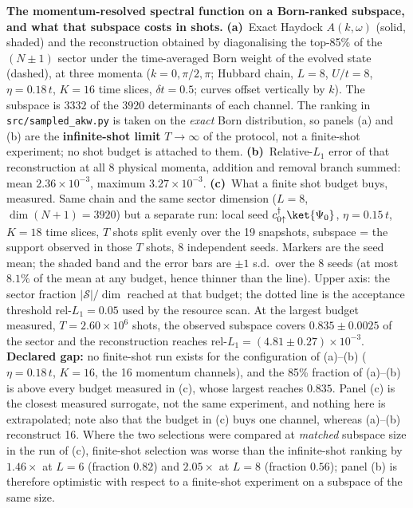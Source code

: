 \caption{\textbf{The momentum-resolved spectral function on a Born-ranked subspace, and what that
subspace costs in shots.}
\textbf{(a)}~Exact Haydock $A(k,\omega)$ (solid, shaded) and the reconstruction obtained by
diagonalising the top-85\% of the $(N{\pm}1)$ sector under the time-averaged Born weight of the
evolved state (dashed), at three momenta ($k=0,\pi/2,\pi$; Hubbard chain, $L=8$, $U/t=8$,
$\eta=0.18\,t$, $K=16$ time slices, $\delta t=0.5$; curves offset vertically by $k$).
The subspace is $3332$ of the $3920$ determinants of each channel. The ranking in
\texttt{src/sampled\_akw.py} is taken on the \emph{exact} Born distribution, so panels (a) and (b)
are the \textbf{infinite-shot limit} $T\rightarrow\infty$ of the protocol, not a finite-shot experiment;
no shot budget is attached to them.
\textbf{(b)}~Relative-$L_1$ error of that reconstruction at all 8 physical momenta, addition and
removal branch summed: mean $2.36\times10^{-3}$, maximum $3.27\times10^{-3}$.
\textbf{(c)}~What a finite shot budget buys, measured. Same chain and the same sector dimension
($L=8$, $\dim(N{+}1)=3920$) but a separate run: local seed $c^{\dagger}_{0\uparrow}\ket{\Psi_0}$,
$\eta=0.15\,t$, $K=18$ time slices, $T$ shots split evenly over the 19 snapshots, subspace
= the support observed in those $T$ shots, 8 independent seeds. Markers are the seed mean; the
shaded band and the error bars are $\pm1$ s.d.\ over the 8 seeds (at most $8.1\%$ of the
mean at any budget, hence thinner than the line). Upper axis: the sector fraction $|\mathcal S|/\dim$
reached at that budget; the dotted line is the acceptance threshold rel-$L_1=0.05$ used by the
resource scan. At the largest budget measured, $T=2.60\times10^{6}$ shots, the observed subspace covers
$0.835\pm0.0025$ of the sector and the reconstruction reaches
rel-$L_1=(4.81\pm0.27)\times10^{-3}$.
\textbf{Declared gap:} no finite-shot run exists for the configuration of (a)--(b)
($\eta=0.18\,t$, $K=16$, the 16 momentum channels), and the 85\% fraction of (a)--(b)
is above every budget measured in (c), whose largest reaches $0.835$. Panel (c) is the closest
measured surrogate, not the same experiment, and nothing here is extrapolated; note also that the
budget in (c) buys one channel, whereas (a)--(b) reconstruct 16. Where the two
selections were compared at \emph{matched} subspace size in the run of (c), finite-shot selection was
worse than the infinite-shot ranking by $1.46\times$ at $L=6$ (fraction $0.82$) and
$2.05\times$ at $L=8$ (fraction $0.56$); panel (b) is therefore optimistic with respect to a
finite-shot experiment on a subspace of the same size.}
\label{fig:akwsampled}
